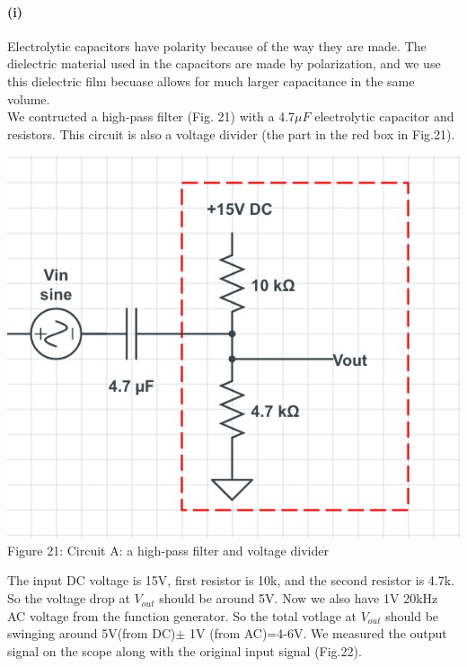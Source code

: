 \documentclass[]{article}
\begin{document}
	\paragraph{ (i)}
Electrolytic capacitors have polarity because of the way they are made. The dielectric material used in the capacitors are made by polarization, and we use this dielectric film becuase allows for much larger capacitance in the same volume. \\
We contructed a high-pass filter (Fig. 21) with a 4.7$\mu F$ electrolytic capacitor and resistors. This circuit is also a voltage divider (the part in the red box in Fig.21). 
	\begin{center}
		\includegraphics[scale=0.3]{i_circuitA}\\
		Figure 21: Circuit A: a high-pass filter and voltage divider 
	\end{center}
The input DC voltage is 15V, first resistor is 10k, and the second resistor is 4.7k. So the voltage drop at $V_{out}$ should be around 5V. Now we also have 1V 20kHz AC voltage from the function generator. So the total votlage at $V_{out}$ should be swinging around 5V(from DC)$\pm$ 1V (from AC)=4-6V. We measured the output signal on the scope along with the original input signal (Fig.22). 
\end{document}
